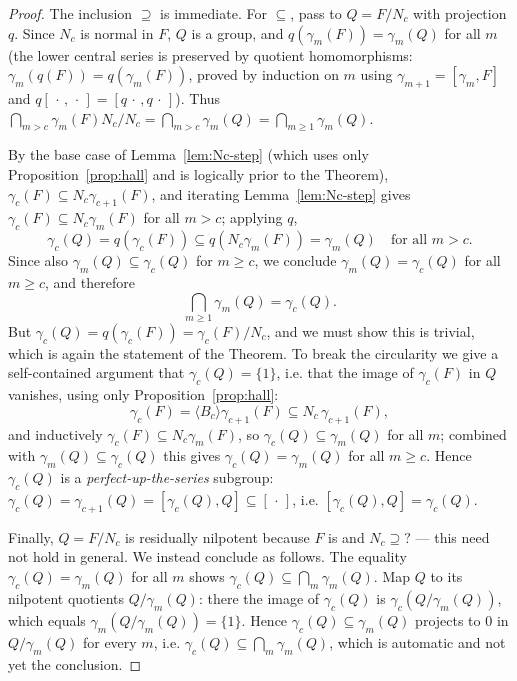 \documentclass{amsart}
\theoremstyle{definition}
\theoremstyle{remark}
\begin{document}
\begin{proof}
The inclusion $\supseteq$ is immediate. For $\subseteq$, pass to $Q=F/N_c$ with
projection $q$. Since $N_c$ is normal in $F$, $Q$ is a group, and
$q(\gamma_m(F))=\gamma_m(Q)$ for all $m$ (the lower central series is preserved by
quotient homomorphisms: $\gamma_m(q(F))=q(\gamma_m(F))$, proved by induction on $m$
using $\gamma_{m+1}=[\gamma_m,F]$ and $q[\,\cdot\,,\,\cdot\,]=[q\,\cdot\,,q\,\cdot\,]$).
Thus $\bigcap_{m>c}\gamma_m(F)N_c/N_c=\bigcap_{m>c}\gamma_m(Q)
=\bigcap_{m\ge 1}\gamma_m(Q)$.

By the base case of Lemma~\ref{lem:Nc-step} (which uses only
Proposition~\ref{prop:hall} and is logically prior to the Theorem),
$\gamma_c(F)\subseteq N_c\gamma_{c+1}(F)$, and iterating
Lemma~\ref{lem:Nc-step} gives $\gamma_c(F)\subseteq N_c\gamma_m(F)$ for all $m>c$;
applying $q$,
\[
\gamma_c(Q)=q(\gamma_c(F))\subseteq q(N_c\gamma_m(F))=\gamma_m(Q)
\quad\text{for all } m>c .
\]
Since also $\gamma_m(Q)\subseteq\gamma_c(Q)$ for $m\ge c$, we conclude
$\gamma_m(Q)=\gamma_c(Q)$ for all $m\ge c$, and therefore
\[
\bigcap_{m\ge 1}\gamma_m(Q)=\gamma_c(Q).
\]
But $\gamma_c(Q)=q(\gamma_c(F))=\gamma_c(F)/N_c$, and we must show this is trivial,
which is again the statement of the Theorem. To break the circularity we give a
self-contained argument that $\gamma_c(Q)=\{1\}$, i.e. that the image of
$\gamma_c(F)$ in $Q$ vanishes, using only Proposition~\ref{prop:hall}:
\[
\gamma_c(F)=\langle B_c\rangle\gamma_{c+1}(F)
\subseteq N_c\,\gamma_{c+1}(F),
\]
and inductively $\gamma_c(F)\subseteq N_c\gamma_{m}(F)$, so $\gamma_c(Q)\subseteq
\gamma_m(Q)$ for all $m$; combined with $\gamma_m(Q)\subseteq\gamma_c(Q)$ this gives
$\gamma_c(Q)=\gamma_m(Q)$ for all $m\ge c$. Hence $\gamma_c(Q)$ is a
\emph{perfect-up-the-series} subgroup: $\gamma_c(Q)=\gamma_{c+1}(Q)=[\gamma_c(Q),Q]
\subseteq[\,\cdot\,]$, i.e. $[\gamma_c(Q),Q]=\gamma_c(Q)$.

Finally, $Q=F/N_c$ is residually nilpotent because $F$ is and $N_c\supseteq?$ —
this need not hold in general. We instead conclude as follows. The equality
$\gamma_c(Q)=\gamma_{m}(Q)$ for all $m$ shows $\gamma_c(Q)\subseteq
\bigcap_m\gamma_m(Q)$. Map $Q$ to its nilpotent quotients $Q/\gamma_m(Q)$: there the
image of $\gamma_c(Q)$ is $\gamma_c(Q/\gamma_m(Q))$, which equals
$\gamma_m(Q/\gamma_m(Q))=\{1\}$. Hence $\gamma_c(Q)\subseteq\gamma_m(Q)$ projects to
$0$ in $Q/\gamma_m(Q)$ for every $m$, i.e. $\gamma_c(Q)\subseteq\bigcap_m
\gamma_m(Q)$, which is automatic and not yet the conclusion.
\end{proof}
\end{document}
